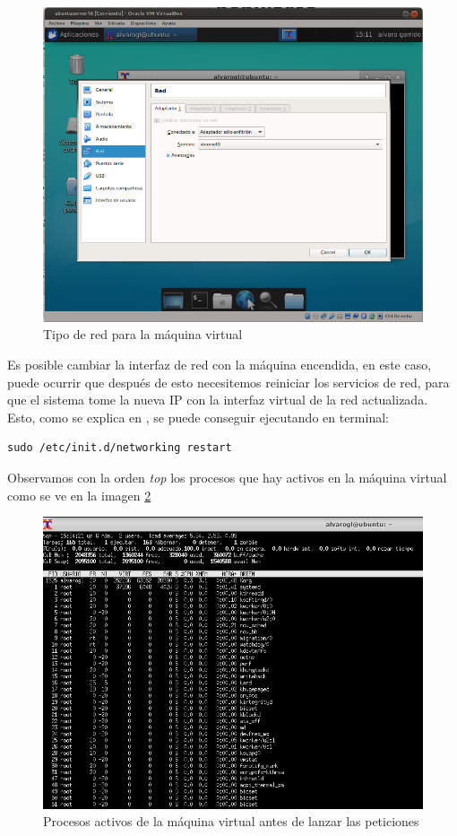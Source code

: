 \begin{figure}[H]
	\centering
	\includegraphics[scale=0.6]{cuestion2-01.png}
	\caption{Tipo de red para la máquina virtual} \label{cuestion2-01}
\end{figure}

Es posible cambiar la interfaz de red con la máquina encendida, en este caso, puede ocurrir que después de esto necesitemos reiniciar los servicios de red, para que el sistema tome la nueva IP con la interfaz virtual de la red actualizada. Esto, como se explica en \cite{network}, se puede conseguir ejecutando en terminal:

\begin{verbatim}
sudo /etc/init.d/networking restart
\end{verbatim}

Observamos con la orden \textit{top} los procesos que hay activos en la máquina virtual como se ve en la imagen \ref{cuestion2-02}

\begin{figure}[H]
	\centering
	\includegraphics[scale=0.35]{cuestion2-02.png}
	\caption{Procesos activos de la máquina virtual antes de lanzar las peticiones} \label{cuestion2-02}
\end{figure}

